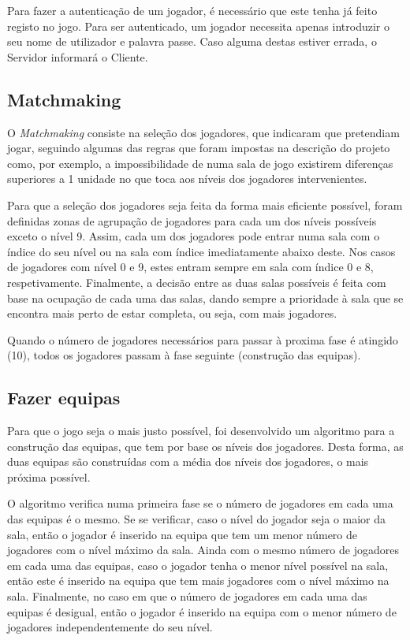 \documentclass[a4paper]{article}
\begin{document}
\par Para fazer a autenticação de um jogador, é necessário que este tenha já feito registo no jogo. Para ser autenticado, um jogador necessita apenas introduzir o seu nome de utilizador e palavra passe. Caso alguma destas estiver errada, o Servidor informará o Cliente.


\subsection{Matchmaking}
\label{sec:3.2}

\hspace{3mm} O \textit{Matchmaking} consiste na seleção dos jogadores, que indicaram que pretendiam jogar, seguindo algumas das regras que foram impostas na descrição do projeto como, por exemplo, a impossibilidade de numa sala de jogo existirem diferenças superiores a 1 unidade no que toca aos níveis dos jogadores intervenientes.

\par Para que a seleção dos jogadores seja feita da forma mais eficiente possível, foram definidas zonas de agrupação de jogadores para cada um dos níveis possíveis exceto o nível 9. Assim, cada um dos jogadores pode entrar numa sala com o índice do seu nível ou na sala com índice imediatamente abaixo deste. Nos casos de jogadores com nível 0 e 9, estes entram sempre em sala com índice 0 e 8, respetivamente. Finalmente, a decisão entre as duas salas possíveis é feita com base na ocupação de cada uma das salas, dando sempre a prioridade à sala que se encontra mais perto de estar completa, ou seja, com mais jogadores.

\par Quando o número de jogadores necessários para passar à proxima fase é atingido (10), todos os jogadores passam à fase seguinte (construção das equipas).


\subsection{Fazer equipas}
\label{sec:3.3}

\hspace{3mm} Para que o jogo seja o mais justo possível, foi desenvolvido um algoritmo para a construção das equipas, que tem por base os níveis dos jogadores. Desta forma, as duas equipas são construídas com a média dos níveis dos jogadores, o mais próxima possível.

\par O algoritmo verifica numa primeira fase se o número de jogadores em cada uma das equipas é o mesmo. Se se verificar, caso o nível do jogador seja o maior da sala, então o jogador é inserido na equipa que tem um menor número de jogadores com o nível máximo da sala. Ainda com o mesmo número de jogadores em cada uma das equipas, caso o jogador tenha o menor nível possível na sala, então este é inserido na equipa que tem mais jogadores com o nível máximo na sala. Finalmente, no caso em que o número de jogadores em cada uma das equipas é desigual, então o jogador é inserido na equipa com o menor número de jogadores independentemente do seu nível.
\end{document}
